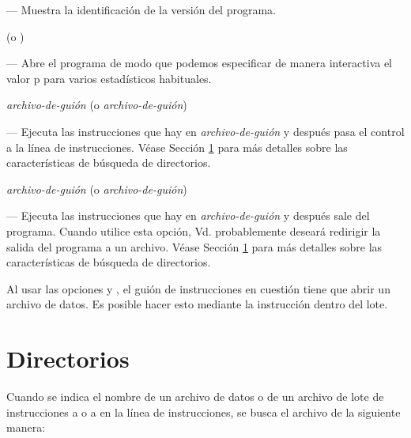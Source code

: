 --- Muestra la identificación de la versión del programa.

 (o )

--- Abre el programa de modo que podemos especificar de manera
interactiva el valor p para varios estadísticos habituales.

 \textsl{archivo-de-guión} (o 
\textsl{archivo-de-guión})

--- Ejecuta las instrucciones que hay en \textsl{archivo-de-guión} y
después pasa el control a la línea de instrucciones. Véase Sección
\ref{path-search} para más detalles sobre las características de
búsqueda de directorios.

 \textsl{archivo-de-guión} (o 
\textsl{archivo-de-guión})

--- Ejecuta las instrucciones que hay en \textsl{archivo-de-guión} y
después sale del programa.  Cuando utilice esta opción,
Vd. probablemente deseará redirigir la salida del programa a un
archivo. Véase Sección \ref{path-search} para más detalles sobre las
características de búsqueda de directorios.

Al usar las opciones  y , el guión de
instrucciones en cuestión tiene que abrir un archivo de datos. Es
posible hacer esto mediante la instrucción  dentro del lote.



\section{Directorios}
\label{path-search}

Cuando se indica el nombre de un archivo de datos o de un archivo de
lote de instrucciones a  o a  en la línea de
instrucciones, se busca el archivo de la siguiente manera:

